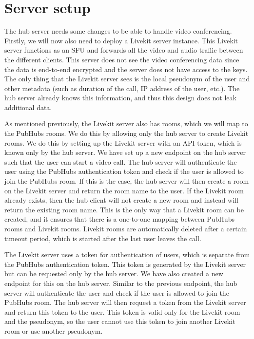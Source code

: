 \documentclass{report}
\begin{document}
\section{Server setup}\label{sec:server-setup}
The hub server needs some changes to be able to handle video conferencing. Firstly, we will now also need to deploy a
Livekit server instance. This Livekit server functions as an SFU and forwards all the video and audio traffic
between the different clients. This server does not see the video conferencing data since the data is end-to-end
encrypted and the server does not have access to the keys. The only thing that the Livekit server sees is the local
pseudonym of the user and other metadata (such as duration of the call, IP address of the user, etc.). The hub
server already knows this information, and thus this design does not leak additional data.

As mentioned previously, the Livekit server also has rooms, which we will map to the PubHubs rooms. We do this by
allowing only the hub server to create Livekit rooms. We do this by setting up the Livekit server with an API token,
which is known only by the hub server. We have set up a new endpoint on the hub server such that the user can
start a video call. The hub server will authenticate the user using the PubHubs authentication token and check if
the user is allowed to join the PubHubs room. If this is the case, the hub server will then create a room on the
Livekit server and return the room name to the user. If the Livekit room already exists, then the hub client will not
create a new room and instead will return the existing room name. This is the only way that a Livekit room can be created,
and it ensures that there is a one-to-one mapping between PubHubs rooms and Livekit rooms. Livekit rooms are automatically
deleted after a certain timeout period, which is started after the last user leaves the call.

The Livekit server uses a token for authentication of users, which is separate from the PubHubs authentication token.
This token is generated by the Livekit server but can be requested only by the hub server.
We have also created a new endpoint for this on the hub server. Similar to the previous endpoint, the hub server will
authenticate the user and check if the user is allowed to join the PubHubs room. The hub server will then request a
token from the Livekit server and return this token to the user. This token is valid only for the Livekit room and the
pseudonym, so the user cannot use this token to join another Livekit room or use another pseudonym.
\end{document}
